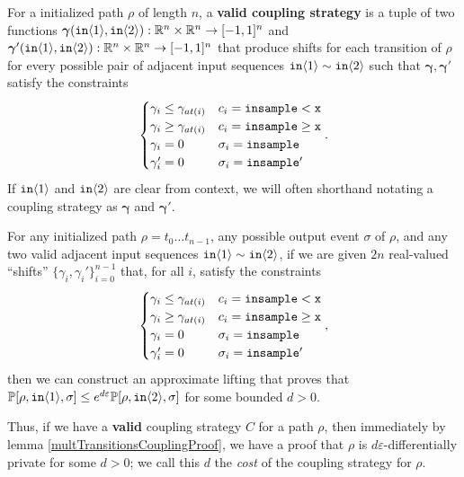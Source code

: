 \begin{defn}
  For a initialized path $\rho$ of length $n$, a \textbf{valid coupling strategy} is a tuple of two functions $\bm{\gamma}(\texttt{in}\brangle{1}, \texttt{in}\brangle{2}):\RR^n\times \RR^n\to [-1, 1]^n$ and $\bm{\gamma}'(\texttt{in}\brangle{1}, \texttt{in}\brangle{2}):\RR^n\times \RR^n\to [-1, 1]^n$ 
  that produce shifts for each transition of $\rho$ for every possible pair of adjacent input sequences $\texttt{in}\brangle{1}\sim\texttt{in}\brangle{2}$ such that $\bm{\gamma}, \bm{\gamma'}$ satisfy the constraints \[
    \begin{cases}
      \gamma_i\leq\gamma_{at(i)} & c_i = \lguard[\texttt{x}]\\
      \gamma_i\geq\gamma_{at(i)} & c_i = \gguard[\texttt{x}]\\
      \gamma_i=0 & \sigma_i = \texttt{insample}\\
      \gamma_i'=0 & \sigma_i = \texttt{insample}'
    \end{cases}.
  \]
  If $\texttt{in}\brangle{1}$ and $\texttt{in}\brangle{2}$ are clear from context, we will often shorthand notating a coupling strategy as $\bm{\gamma}$ and $\bm{\gamma}'$. 
\end{defn}


\begin{lemma}\label{simplifiedMultTransitionsCouplingProof}
  For any initialized path $\rho = t_0\ldots t_{n-1}$, any possible output event $\sigma$ of $\rho$, and any two valid adjacent input sequences $\texttt{in}\brangle{1}\sim \texttt{in}\brangle{2}$, if we are given $2n$ real-valued ``shifts'' $\{\gamma_i, \gamma_i'\}_{i=0}^{n-1}$ that, for all $i$, satisfy the constraints \[
        \begin{cases}
          \gamma_i\leq\gamma_{at(i)} & c_i = \lguard[\texttt{x}]\\
          \gamma_i\geq\gamma_{at(i)} & c_i = \gguard[\texttt{x}]\\
          \gamma_i=0 & \sigma_i = \texttt{insample}\\
          \gamma_i'=0 & \sigma_i = \texttt{insample}'
        \end{cases},
      \]
      then we can construct an approximate lifting that proves that $\PP[\rho, \texttt{in}\brangle{1}, \sigma] \leq e^{d\varepsilon}\PP[\rho, \texttt{in}\brangle{2}, \sigma]$ for some bounded $d>0$. 
\end{lemma}


Thus, if we have a \textbf{valid} coupling strategy $C$ for a path $\rho$, then immediately by lemma \ref{multTransitionsCouplingProof}, we have a proof that $\rho$ is $d\varepsilon$-differentially private for some $d>0$; we call this $d$ the \textit{cost} of the coupling strategy for $\rho$. 

